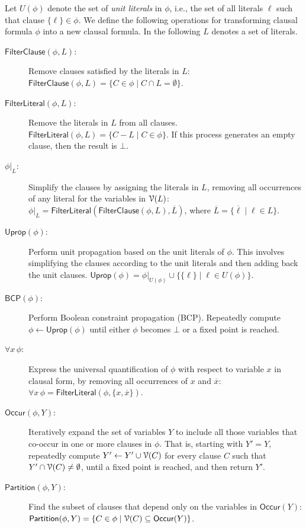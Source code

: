 \documentclass[letterpaper,USenglish,cleveref, autoref, thm-restate]{lipics-v2021}
\newcommand{\nil}{\bot}
\newcommand{\obar}[1]{\overline{#1}}
\newcommand{\lit}{\ell}
\newcommand{\dependencyset}{{\cal V}}
\newcommand{\simplify}[2]{#1|_{#2}}
\newcommand{\ureduce}[2]{\forall #2\, #1}
\newcommand{\algo}[1]{\textsf{#1}}
\newcommand{\cfilter}{\algo{FilterClause}}
\newcommand{\lfilter}{\algo{FilterLiteral}}
\newcommand{\bcp}{\algo{BCP}}
\newcommand{\uprop}{\algo{Uprop}}
\newcommand{\partition}{\algo{Partition}}
\newcommand{\occur}{\algo{Occur}}
\begin{document}
Let $U(\phi)$ denote the set of \emph{unit literals} in $\phi$, i.e., the set of all literals $\lit$ such that clause $\{ \lit \} \in \phi$.  
We define the following operations for transforming clausal formula $\phi$ into a new clausal formula.  In the following $L$ denotes a set of literals.
\begin{description}
\item[$\cfilter(\phi, L)$:] Remove clauses satisfied by the literals in $L$: $\cfilter(\phi, L) = \{ C \in \phi \mid C \cap L = \emptyset\}$.

\item[$\lfilter(\phi, L)$:] Remove the literals in $L$ from all clauses.  
   $\lfilter(\phi, L) = \{ C - L \mid  C \in \phi \}$.  If this process generates an empty clause, then the result is $\nil$.

\item[$\simplify{\phi}{L}$:] Simplify the clauses by assigning the literals in $L$, removing all occurrences of any literal for the variables in $\dependencyset(L)$:
$\simplify{\phi}{L} = \lfilter(\cfilter(\phi, L), \obar{L})$, where $\obar{L} = \{ \obar{\lit} \mid \lit \in L \}$.

\item[$\uprop(\phi)$:]  Perform unit propagation based on the unit literals of $\phi$.  This involves simplifying the clauses according to the unit literals and then adding back the unit clauses.
$\uprop(\phi) = \simplify{\phi}{U(\phi)} \cup \{ \{\lit \} \mid  \lit \in U(\phi) \}$.

\item[$\bcp(\phi)$:] Perform Boolean constraint propagation (BCP).
  Repeatedly compute $\phi \leftarrow \uprop(\phi)$ until either $\phi$ becomes $\nil$ or a fixed point is reached.

\item[$\ureduce{\phi}{x}$:] Express the universal quantification of $\phi$ with respect to variable $x$ in clausal form, by removing all occurrences of $x$ and $\obar{x}$:
$\ureduce{\phi}{x} = \lfilter(\phi, \{x, \obar{x}\})$.

\item[$\occur(\phi, Y)$:] Iteratively expand the set of variables $Y$ to include all those variables that co-occur in one or more clauses in $\phi$.
  That is, starting with $Y' = Y$,
  repeatedly compute $Y' \leftarrow Y' \cup \dependencyset(C)$
  for every clause $C$ such that $Y' \cap \dependencyset(C) \not = \emptyset$,
  until a fixed point is reached, and then return $Y'$.

\item[$\partition(\phi, Y)$:] Find the subset of clauses that depend only on the variables in $\occur(Y)$:
$\partition(\phi, Y) = \{ C \in \phi \mid \dependencyset(C) \subseteq \occur(Y)\}$.

\end{description}
\end{document}
